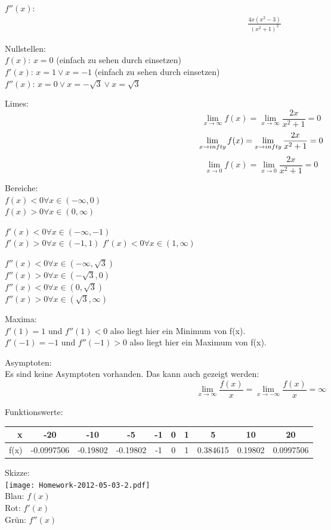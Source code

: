 \documentclass[a4paper]{scrartcl}
\begin{document}
\begin{enumerate}
\(f''(x)\):
\begin{align}
&\frac {4x(x^2-3)} {(x^2+1)^3}
\end{align}

Nullstellen:\\
\(f(x)\): \(x = 0\) (einfach zu sehen durch einsetzen)\\
\(f'(x)\): \(x = 1 \vee x = -1\) (einfach zu sehen durch einsetzen)\\
\(f''(x)\): \(x = 0 \vee x = -\sqrt 3 \vee x = \sqrt 3\)

Limes:\\
\[\lim_{x \to \infty} f(x) = \lim_{x \to \infty} \frac {2x} {x^2+1} = 0\]
\[\lim_{x \to \-infty} f(x) = \lim_{x \to \-infty} \frac {2x} {x^2+1} = 0\]
\[\lim_{x \to 0} f(x) = \lim_{x \to 0} \frac {2x} {x^2+1} = 0\]

Bereiche:\\
\(f(x) < 0 \forall x \in (-\infty,0)\)\\
\(f(x) > 0 \forall x \in (0,\infty)\)

\(f'(x) < 0 \forall x \in (-\infty,-1)\)\\
\(f'(x) > 0 \forall x \in (-1,1)\)
\(f'(x) < 0 \forall x \in (1,\infty)\)


\(f''(x) < 0 \forall x \in (-\infty,\sqrt 3)\)\\
\(f''(x) > 0 \forall x \in (-\sqrt 3,0)\)\\
\(f''(x) < 0 \forall x \in (0, \sqrt 3)\)\\
\(f''(x) > 0 \forall x \in (\sqrt 3, \infty)\)

Maxima:\\
\(f'(1) = 1\) und \(f''(1) < 0\) also liegt hier ein Minimum von f(x).\\
\(f'(-1) = -1\) und \(f''(-1) > 0\) also liegt hier ein Maximum von f(x).

Asymptoten:\\
Es sind keine Asymptoten vorhanden. Das kann auch gezeigt werden:
\[\lim_{x \to \infty} \frac {f(x)} x = \lim_{x \to -\infty} \frac {f(x)} x = \infty\]

Funktionswerte:\\
\begin{tabular}{r|c|c|c|c|c|c|c|c|c}
x & -20 & -10 & -5 & -1 & 0 & 1 & 5 & 10 & 20\\
\hline
f(x) & -0.0997506 & -0.19802 & -0.19802 & -1 & 0 & 1 & 0.384615 & 0.19802 & 0.0997506
\end{tabular}

Skizze:\\
\hspace*{-1.5in}
\texttt{[image: Homework-2012-05-03-2.pdf]}\\
Blau: \(f(x)\)\\
Rot: \(f'(x)\)\\
Grün: \(f''(x)\)



\end{enumerate}
\end{document}
